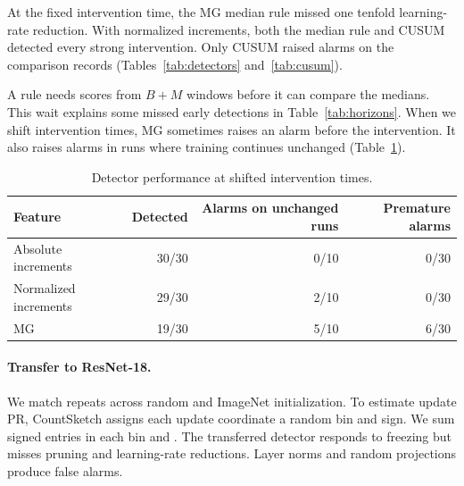 {\begin{table}[!htbp]
\centering\small
\caption{Detector settings fixed before evaluation.}
\label{tab:baseline_rules}

\end{table}

\begin{table}[!htbp]
\centering\scriptsize\setlength{\tabcolsep}{2pt}
\caption{CNN intervention detection using cumulative sums. Delay is the median among detected interventions.}
\label{tab:cusum}

\end{table}

At the fixed intervention time, the MG median rule missed one tenfold learning-rate reduction. With normalized increments, both the median rule and CUSUM detected every strong intervention. Only CUSUM raised alarms on the comparison records (Tables~\ref{tab:detectors} and~\ref{tab:cusum}).

\begin{table}[!htbp]
\centering\small
\caption{CNN detections by time allowed after intervention. Rules needing eight windows can first score at update 5,500, a delay of 1,500 updates.}
\label{tab:horizons}

\end{table}

A rule needs scores from $B+M$ windows before it can compare the medians. This wait explains some missed early detections in Table~\ref{tab:horizons}. When we shift intervention times, MG sometimes raises an alarm before the intervention. It also raises alarms in runs where training continues unchanged (Table~\ref{tab:detector-transfer}).

\begin{table}[!htbp]
\centering\small
\caption{Detector performance at shifted intervention times.}
\label{tab:detector-transfer}
\begingroup
\begin{tabular}{lrrr}
\toprule
Feature & Detected & Alarms on unchanged runs & Premature alarms \\
\midrule
Absolute increments & 30/30 & 0/10 & 0/30 \\
Normalized increments & 29/30 & 2/10 & 0/30 \\
MG & 19/30 & 5/10 & 6/30 \\
\bottomrule
\end{tabular}
\endgroup
\end{table}

\paragraph{Transfer to ResNet-18.}
We match repeats across random and ImageNet initialization. To estimate update PR, CountSketch \citep{charikar2002finding} assigns each update coordinate a random bin and sign. We sum signed entries in each bin and . The transferred detector responds to freezing but misses pruning and learning-rate reductions. Layer norms and random projections produce false alarms.

}
